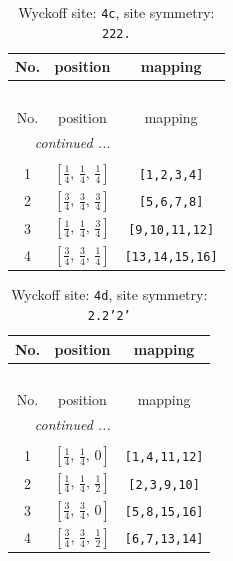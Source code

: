 \documentclass[fleqn,8pt]{jsarticle}
\begin{document}
\renewcommand{\arraystretch}{1.2}
\begin{longtable}{ccc}
\caption{Wyckoff site: {\tt 4c}, site symmetry: {\tt 222.}}
 \\
 \hline \hline
No. & position & mapping \\ \hline \endfirsthead

\multicolumn{2}{l}{\tablename\ \thetable{}} \\
 \hline \hline
No. & position & mapping \\ \hline \endhead

 \hline \hline
\multicolumn{2}{r}{\footnotesize\it continued ...} \\ \endfoot

 \hline \hline
\multicolumn{2}{r}{} \\ \endlastfoot

1 & $\left[ \frac{1}{4},\, \frac{1}{4},\, \frac{1}{4} \right]$ & {\tt [1,2,3,4]} \\ \hline
2 & $\left[ \frac{3}{4},\, \frac{3}{4},\, \frac{3}{4} \right]$ & {\tt [5,6,7,8]} \\ \hline
3 & $\left[ \frac{1}{4},\, \frac{1}{4},\, \frac{3}{4} \right]$ & {\tt [9,10,11,12]} \\ \hline
4 & $\left[ \frac{3}{4},\, \frac{3}{4},\, \frac{1}{4} \right]$ & {\tt [13,14,15,16]} \\
\end{longtable}
\renewcommand{\arraystretch}{1.2}
\begin{longtable}{ccc}
\caption{Wyckoff site: {\tt 4d}, site symmetry: {\tt 2.2'2'}}
 \\
 \hline \hline
No. & position & mapping \\ \hline \endfirsthead

\multicolumn{2}{l}{\tablename\ \thetable{}} \\
 \hline \hline
No. & position & mapping \\ \hline \endhead

 \hline \hline
\multicolumn{2}{r}{\footnotesize\it continued ...} \\ \endfoot

 \hline \hline
\multicolumn{2}{r}{} \\ \endlastfoot

1 & $\left[ \frac{1}{4},\, \frac{1}{4},\, 0 \right]$ & {\tt [1,4,11,12]} \\ \hline
2 & $\left[ \frac{1}{4},\, \frac{1}{4},\, \frac{1}{2} \right]$ & {\tt [2,3,9,10]} \\ \hline
3 & $\left[ \frac{3}{4},\, \frac{3}{4},\, 0 \right]$ & {\tt [5,8,15,16]} \\ \hline
4 & $\left[ \frac{3}{4},\, \frac{3}{4},\, \frac{1}{2} \right]$ & {\tt [6,7,13,14]} \\
\end{longtable}
\end{document}
